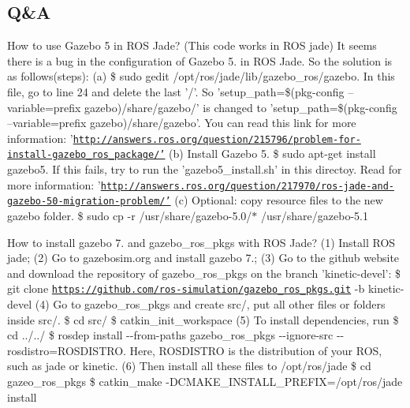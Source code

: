 \subsection*{Q\&A}


\begin{DoxyEnumerate}
\item How to use Gazebo 5 in R\-O\-S Jade? (This code works in R\-O\-S jade) It seems there is a bug in the configuration of Gazebo 5. in R\-O\-S Jade. So the solution is as follows(steps)\-: (a) {\ttfamily \$ sudo gedit /opt/ros/jade/lib/gazebo\-\_\-ros/gazebo}. In this file, go to line 24 and delete the last '/'. So 'setup\-\_\-path=\$(pkg-\/config --variable=prefix gazebo)/share/gazebo/' is changed to 'setup\-\_\-path=\$(pkg-\/config --variable=prefix gazebo)/share/gazebo'. You can read this link for more information\-: '\href{http://answers.ros.org/question/215796/problem-for-install-gazebo_ros_package/'}{\tt http\-://answers.\-ros.\-org/question/215796/problem-\/for-\/install-\/gazebo\-\_\-ros\-\_\-package/'} (b) Install Gazebo 5. {\ttfamily \$ sudo apt-\/get install gazebo5}. If this fails, try to run the 'gazebo5\-\_\-install.\-sh' in this directoy. Read for more information\-: '\href{http://answers.ros.org/question/217970/ros-jade-and-gazebo-50-migration-problem/'}{\tt http\-://answers.\-ros.\-org/question/217970/ros-\/jade-\/and-\/gazebo-\/50-\/migration-\/problem/'} (c) Optional\-: copy resource files to the new gazebo folder. {\ttfamily \$ sudo cp -\/r /usr/share/gazebo-\/5.0/$\ast$ /usr/share/gazebo-\/5.1}
\item How to install gazebo 7. and gazebo\-\_\-ros\-\_\-pkgs with R\-O\-S Jade? (1) Install R\-O\-S jade; (2) Go to gazebosim.\-org and install gazebo 7.; (3) Go to the github website and download the repository of gazebo\-\_\-ros\-\_\-pkgs on the branch 'kinetic-\/devel'\-: {\ttfamily \$ git clone \href{https://github.com/ros-simulation/gazebo_ros_pkgs.git}{\tt https\-://github.\-com/ros-\/simulation/gazebo\-\_\-ros\-\_\-pkgs.\-git} -\/b kinetic-\/devel} (4) Go to gazebo\-\_\-ros\-\_\-pkgs and create src/, put all other files or folders inside src/. {\ttfamily \$ cd src/} {\ttfamily \$ catkin\-\_\-init\-\_\-workspace} (5) To install dependencies, run {\ttfamily \$ cd ../../} {\ttfamily \$ rosdep install -\/-\/from-\/paths gazebo\-\_\-ros\-\_\-pkgs -\/-\/ignore-\/src -\/-\/rosdistro=R\-O\-S\-D\-I\-S\-T\-R\-O}. Here, R\-O\-S\-D\-I\-S\-T\-R\-O is the distribution of your R\-O\-S, such as jade or kinetic. (6) Then install all these files to /opt/ros/jade {\ttfamily \$ cd gazeo\-\_\-ros\-\_\-pkgs} {\ttfamily \$ catkin\-\_\-make -\/\-D\-C\-M\-A\-K\-E\-\_\-\-I\-N\-S\-T\-A\-L\-L\-\_\-\-P\-R\-E\-F\-I\-X=/opt/ros/jade install} 
\end{DoxyEnumerate}